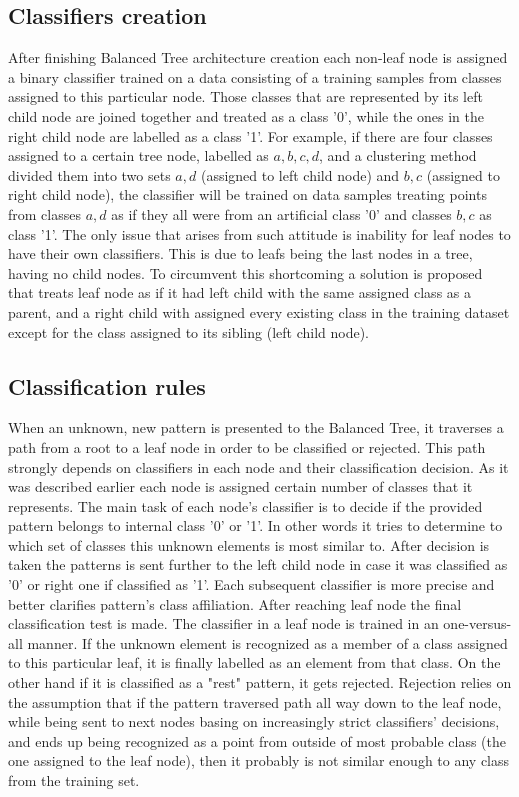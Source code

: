 \subsection{Classifiers creation}

After finishing Balanced Tree architecture creation each non-leaf node is assigned a binary classifier trained on a data consisting of a training samples from classes assigned to this particular node. Those classes that are represented by its left child node are joined together and treated as a class '0', while the ones in the right child node are labelled as a class '1'. For example, if there are four classes assigned to a certain tree node, labelled as $a, b, c, d$, and a clustering method divided them into two sets $a, d$ (assigned to left child node) and $b, c$ (assigned to right child node), the classifier will be trained on data samples treating points from classes $a, d$ as if they all were from an artificial class '0' and classes $b, c$ as class '1'. The only issue that arises from such attitude is inability for leaf nodes to have their own classifiers. This is due to leafs being the last nodes in a tree, having no child nodes. To circumvent this shortcoming a solution is proposed that treats leaf node as if it had left child with the same assigned class as a parent, and a right child with assigned every existing class in the training dataset except for the class assigned to its sibling (left child node).

\subsection{Classification rules}

When an unknown, new pattern is presented to the Balanced Tree, it traverses a path from a root to a leaf node in order to be classified or rejected. This path strongly depends on classifiers in each node and their classification decision. As it was described earlier each node is assigned certain number of classes that it represents. The main task of each node's classifier is to decide if the provided pattern belongs to internal class '0' or '1'. In other words it tries to determine to which set of classes this unknown elements is most similar to. After decision is taken the patterns is sent further to the left child node in case it was classified as '0' or right one if classified as '1'. Each subsequent classifier is more precise and better clarifies pattern's class affiliation. After reaching leaf node the final classification test is made. The classifier in a leaf node is trained in an one-versus-all manner. If the unknown element is recognized as a member of a class assigned to this particular leaf, it is finally labelled as an element from that class. On the other hand if it is classified as a "rest" pattern, it gets rejected. Rejection relies on the assumption that if the pattern traversed path all way down to the leaf node, while being sent to next nodes basing on increasingly strict classifiers' decisions, and ends up being recognized as a point from outside of most probable class (the one assigned to the leaf node), then it probably is not similar enough to any class from the training set.

